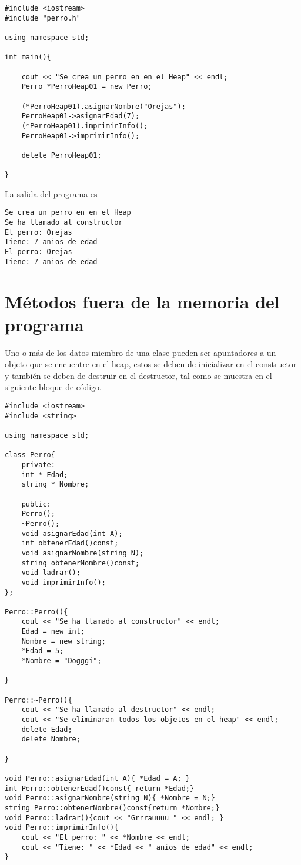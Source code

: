 \documentclass[12pt]{extarticle}
\newcommand{\<}{\langle}
\renewcommand{\>}{\rangle}
\theoremstyle{definition}
\begin{document}
\begin{lstlisting}
#include <iostream>
#include "perro.h"

using namespace std;

int main(){
	
	cout << "Se crea un perro en en el Heap" << endl; 
	Perro *PerroHeap01 = new Perro;
	
	(*PerroHeap01).asignarNombre("Orejas");
	PerroHeap01->asignarEdad(7);
	(*PerroHeap01).imprimirInfo();
	PerroHeap01->imprimirInfo();
	
	delete PerroHeap01;
	
}
\end{lstlisting}

La salida del programa es

\begin{lstlisting}
Se crea un perro en en el Heap
Se ha llamado al constructor
El perro: Orejas
Tiene: 7 anios de edad
El perro: Orejas
Tiene: 7 anios de edad
\end{lstlisting}


\section{Métodos fuera de la memoria del programa} 
Uno o más de los datos miembro de una clase pueden ser apuntadores a un objeto que se encuentre en el heap, estos se deben de inicializar en el constructor y también se deben de destruir en el destructor, tal como se muestra en el siguiente bloque de código.

\begin{lstlisting}
#include <iostream>
#include <string>

using namespace std;

class Perro{
	private:
	int * Edad;
	string * Nombre;
	
	public:
	Perro();
	~Perro();
	void asignarEdad(int A);
	int obtenerEdad()const;
	void asignarNombre(string N);
	string obtenerNombre()const;
	void ladrar();
	void imprimirInfo();
};

Perro::Perro(){
	cout << "Se ha llamado al constructor" << endl;
	Edad = new int;
	Nombre = new string;
	*Edad = 5;
	*Nombre = "Dogggi";
	
}

Perro::~Perro(){
	cout << "Se ha llamado al destructor" << endl; 
	cout << "Se eliminaran todos los objetos en el heap" << endl;
	delete Edad;
	delete Nombre;
	
}

void Perro::asignarEdad(int A){ *Edad = A; }
int Perro::obtenerEdad()const{ return *Edad;}
void Perro::asignarNombre(string N){ *Nombre = N;}
string Perro::obtenerNombre()const{return *Nombre;}
void Perro::ladrar(){cout << "Grrrauuuu " << endl; }
void Perro::imprimirInfo(){
	cout << "El perro: " << *Nombre << endl; 
	cout << "Tiene: " << *Edad << " anios de edad" << endl;
}
\end{lstlisting}
\end{document}

